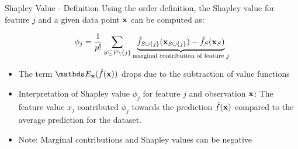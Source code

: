 \documentclass[11pt,compress,t,notes=noshow, aspectratio=169, xcolor=table]{beamer}
\begin{document}
\begin{vbframe}{Shapley Value - Definition  }
  Using the order definition, the Shapley value for feature $j$ and a given data point $\xv$ can be computed as:

     $$ \phi_j  = \frac{1}{p!} \sum_{S \subseteq P\setminus \{j\}} \underbrace{\fh_{\Scupj}(\xv_{\Scupj}) - \fh_{S}(\xv_{S})}_{\text{marginal contribution of feature $j$}} $$
\begin{itemize}
    \item The term $\E_{\xv}(\fh(\xv))$ drops due to the subtraction of value functions
  \item Interpretation of Shapley value $\phi_j$ for feature $j$ and observation $\xv$:
  The feature value $x_j$ contributed $\phi_j$ towards the prediction $\fh(\xv)$ compared to the average prediction for the dataset.
   \item Note: Marginal contributions and Shapley values can be negative
\end{itemize}
\lz

\end{vbframe}
\end{document}
